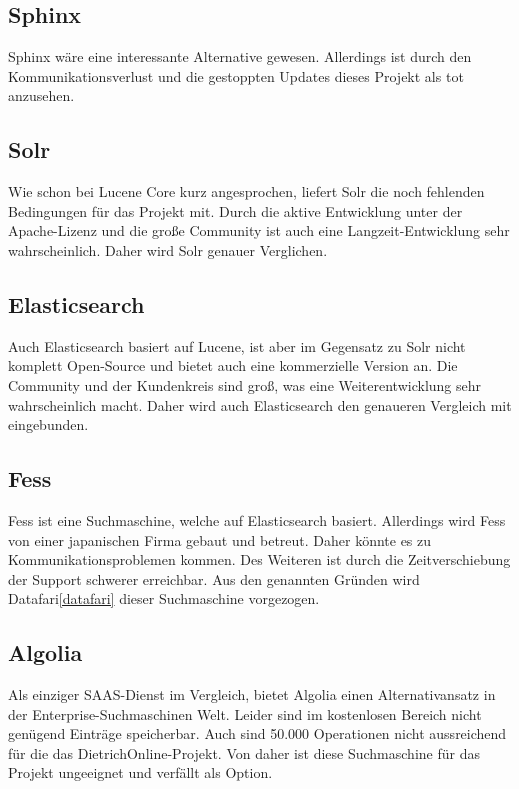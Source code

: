 \subsection{Sphinx}

Sphinx wäre eine interessante Alternative gewesen. Allerdings ist durch den Kommunikationsverlust und die gestoppten Updates dieses Projekt als tot anzusehen. \cite{SphinxTechnologiesInc.2019}

\subsection{Solr}

Wie schon bei Lucene Core kurz angesprochen, liefert Solr die noch fehlenden Bedingungen für das Projekt mit. Durch die aktive Entwicklung unter der Apache-Lizenz und die große Community ist auch eine Langzeit-Entwicklung sehr wahrscheinlich. Daher wird Solr genauer Verglichen. \cite{TheApacheSoftwareFoundation.2019}

\subsection{Elasticsearch}

Auch Elasticsearch basiert auf Lucene, ist aber im Gegensatz zu Solr nicht komplett Open-Source und bietet auch eine kommerzielle Version an. Die Community und der Kundenkreis sind groß, was eine Weiterentwicklung sehr wahrscheinlich macht. Daher wird auch Elasticsearch den genaueren Vergleich mit eingebunden. \cite{Elasticsearch.2019}

\subsection{Fess}

Fess ist eine Suchmaschine, welche auf Elasticsearch basiert. Allerdings wird Fess von einer japanischen Firma gebaut und betreut. Daher könnte es zu Kommunikationsproblemen kommen. Des Weiteren ist durch die Zeitverschiebung der Support schwerer erreichbar. Aus den genannten Gründen wird Datafari\ref{datafari} dieser Suchmaschine vorgezogen. \cite{CodeLibs.2019}

\subsection{Algolia}

Als einziger SAAS-Dienst im Vergleich, bietet Algolia einen Alternativansatz in der Enterprise-Suchmaschinen Welt. Leider sind im kostenlosen Bereich nicht genügend Einträge speicherbar. Auch sind 50.000 Operationen nicht aussreichend für die das DietrichOnline-Projekt. Von daher ist diese Suchmaschine für das Projekt ungeeignet und verfällt als Option. \cite{Algolia.2019}

